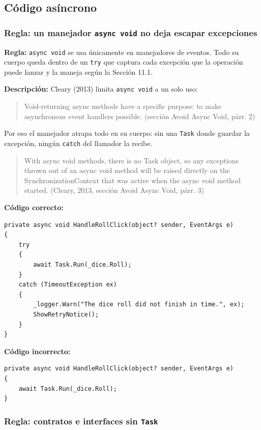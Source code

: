 \subsection{Código asíncrono}

\subsubsection{Regla: un manejador \texttt{async void} no deja escapar excepciones}

\textbf{Regla:} \texttt{async void} se usa únicamente en manejadores de eventos. Todo su cuerpo queda dentro de un \texttt{try} que captura cada excepción que la operación puede lanzar y la maneja según la Sección 11.1.

\textbf{Descripción:} Cleary (2013) limita \texttt{async void} a un solo uso:
\begin{quote}
Void-returning async methods have a specific purpose: to make asynchronous event handlers possible. (sección Avoid Async Void, párr. 2)
\end{quote}
\noindent Por eso el manejador atrapa todo en su cuerpo: sin una \texttt{Task} donde guardar la excepción, ningún \texttt{catch} del llamador la recibe.
\begin{quote}
With async void methods, there is no Task object, so any exceptions thrown out of an async void method will be raised directly on the SynchronizationContext that was active when the async void method started. (Cleary, 2013, sección Avoid Async Void, párr. 3)
\end{quote}

\textbf{Código correcto:}
\begin{lstlisting}[style=csharpstyle]
private async void HandleRollClick(object? sender, EventArgs e)
{
    try
    {
        await Task.Run(_dice.Roll);
    }
    catch (TimeoutException ex)
    {
        _logger.Warn("The dice roll did not finish in time.", ex);
        ShowRetryNotice();
    }
}
\end{lstlisting}

\textbf{Código incorrecto:}
\begin{lstlisting}[style=csharpstyle]
private async void HandleRollClick(object? sender, EventArgs e)
{
    await Task.Run(_dice.Roll);
}
\end{lstlisting}

\subsubsection{Regla: contratos e interfaces sin \texttt{Task}}

